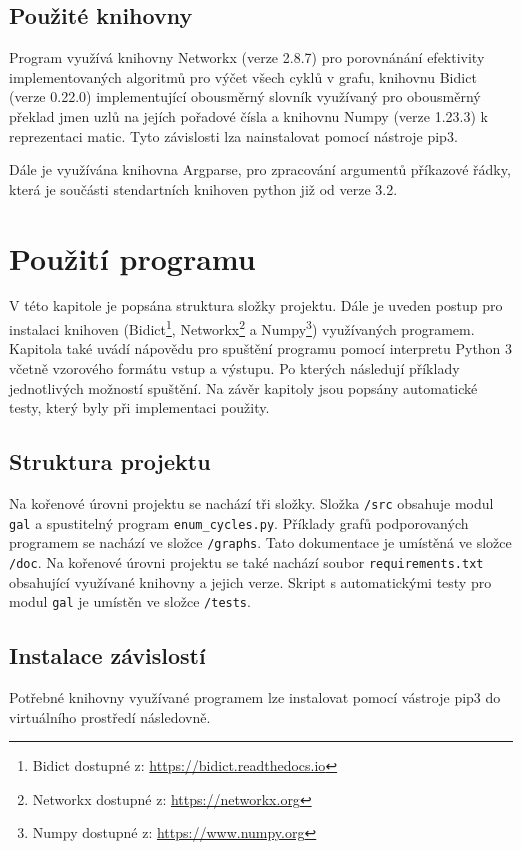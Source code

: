     \newpage

    \section{Použité knihovny}
        Program využívá knihovny Networkx (verze 2.8.7) pro porovnánání efektivity implementovaných algoritmů pro výčet všech cyklů v grafu, knihovnu Bidict (verze 0.22.0) implementující obousměrný slovník využívaný pro obousměrný překlad jmen uzlů na jejích pořadové čísla a knihovnu Numpy (verze 1.23.3) k reprezentaci matic. Tyto závislosti lza nainstalovat pomocí nástroje pip3.

        Dále je využívána knihovna Argparse, pro zpracování argumentů příkazové řádky, která je součásti stendartních knihoven python již od verze 3.2.

\chapter{Použití programu}
    \label{chapter:Help}
    V této kapitole je popsána struktura složky projektu. Dále je uveden postup pro instalaci knihoven (Bidict\footnote{Bidict dostupné z: \url{https://bidict.readthedocs.io}}, Networkx\footnote{Networkx dostupné z: \url{https://networkx.org}} a Numpy\footnote{Numpy dostupné z: \url{https://www.numpy.org}}) využívaných programem. Kapitola také uvádí nápovědu pro spuštění programu pomocí interpretu Python 3 včetně vzorového formátu vstup a výstupu. Po kterých následují příklady jednotlivých možností spuštění. Na závěr kapitoly jsou popsány automatické testy, který byly při implementaci použity.

    \section{Struktura projektu}
        Na kořenové úrovni projektu se nachází tři složky. Složka \texttt{/src} obsahuje modul \texttt{gal} a spustitelný program \texttt{enum\_cycles.py}. Příklady grafů podporovaných programem se nachází ve složce \texttt{/graphs}. Tato dokumentace je umístěná ve složce \texttt{/doc}. Na kořenové úrovni projektu se také nachází soubor \texttt{requirements.txt} obsahující využívané knihovny a jejich verze. Skript s automatickými testy pro modul \texttt{gal} je umístěn ve složce \texttt{/tests}.

    \section{Instalace závislostí}
        Potřebné knihovny využívané programem lze instalovat pomocí vástroje pip3 do virtuálního prostředí následovně.

